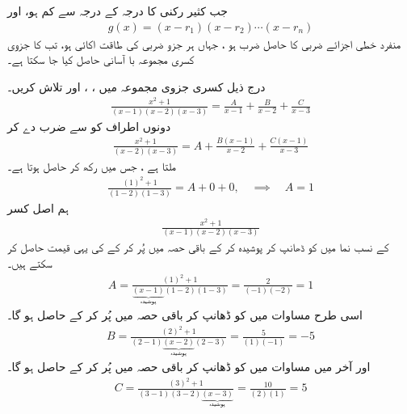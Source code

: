 جب کثیر رکنی  کا درجہ  کے درجہ سے کم ہو، اور
\begin{align*}
g(x)=(x-r_1)(x-r_2)\cdots(x-r_n)
\end{align*}
  منفرد خطی اجزائے ضربی کا حاصل ضرب ہو ، جہاں ہر جزو ضربی  کی طاقت  اکائی  ہو، تب  کا جزوی کسری  مجموعہ با آسانی حاصل کیا جا سکتا ہے۔ 

درج ذیل کسری جزوی مجموعہ میں ،  ، اور  تلاش کریں۔
\begin{align}\label{مساوات_طریقہ_آسان_طریقہ_الف}
\frac{x^2+1}{(x-1)(x-2)(x-3)}=\frac{A}{x-1}+\frac{B}{x-2}+\frac{C}{x-3}
\end{align}
دونوں اطراف کو  سے ضرب دے کر
\begin{align*}
\frac{x^2+1}{(x-2)(x-3)}=A+\frac{B(x-1)}{x-2}+\frac{C(x-1)}{x-3}
\end{align*}
ملتا ہے ، جس میں   رکھ کر   حاصل ہوتا ہے۔
\begin{align*}
\frac{(1)^2+1}{(1-2)(1-3)}=A+0+0,\quad\implies \quad A=1
\end{align*} 
ہم  اصل کسر
\begin{align*}
\frac{x^2+1}{(x-1)(x-2)(x-3)}
\end{align*}
کے نسب نما میں  کو ڈھانپ کر پوشیدہ کر کے  باقی حصہ میں  پُر کر کے  کی یہی قیمت حاصل کر سکتے ہیں۔
\begin{align*}
A=\frac{(1)^2+1}{\underbrace{\boxed{(x-1)}}_{\text{پوشیدہ}}(1-2)(1-3)} =\frac{2}{(-1)(-2)}=1
\end{align*}
اسی طرح مساوات میں  کو ڈھانپ کر باقی حصہ میں  پُر کر کے  حاصل ہو گا۔
\begin{align*}
B=\frac{(2)^2+1}{(2-1)\underbrace{\boxed{(x-2)}}_{\text{پوشیدہ}}(2-3)} =\frac{5}{(1)(-1)}=-5
\end{align*}
اور آخر میں مساوات میں  کو ڈھانپ کر باقی حصہ میں  پُر کر کے  حاصل ہو گا۔
\begin{align*}
C=\frac{(3)^2+1}{(3-1)(3-2)\underbrace{\boxed{(x-3)}}_{\text{پوشیدہ}}}=\frac{10}{(2)(1)}=5
\end{align*}

